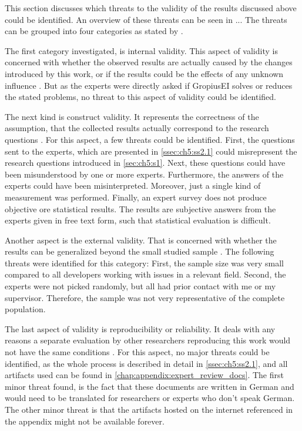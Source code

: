 This section discusses which threats to the validity of the results discussed above could be identified.
An overview of these threats can be seen in ...
The threats can be grouped into four categories as stated by \cite{runeson2009guidelines}.

The first category investigated, is internal validity.
This aspect of validity is concerned with whether the observed results are actually caused by the changes introduced by this work,
or if the results could be the effects of any unknown influence \cite{runeson2009guidelines}.
But as the experts were directly asked if \gls{GropiusEI} solves or reduces the stated problems, no threat to this aspect of validity could be identified.

The next kind is construct validity.
It represents the correctness of the assumption, that the collected results actually correspond to the research questions \cite{runeson2009guidelines}.
For this aspect, a few threats could be identified.
First, the questions sent to the experts, which are presented in \cref{ssec:ch5:ss2.1} could misrepresent the research questions 
introduced in \cref{sec:ch5:s1}.
Next, these questions could have been misunderstood by one or more experts.
Furthermore, the answers of the experts could have been misinterpreted.
Moreover, just a single kind of measurement was performed.
Finally, an expert survey does not produce objective ore statistical results.
The results are subjective answers from the experts given in free text form, such that statistical evaluation is difficult. 

Another aspect is the external validity.
That is concerned with whether the results can be generalized beyond the small studied sample \cite{runeson2009guidelines}.
The following threats were identified for this category:
First, the sample size was very small compared to all developers working with issues in a relevant field.
Second, the experts were not picked randomly, but all had prior contact with me or my supervisor.
Therefore, the sample was not very representative of the complete population.

The last aspect of validity is reproducibility or reliability.
It deals with any reasons a separate evaluation by other researchers reproducing this work would not have the same conditions \cite{runeson2009guidelines}.
For this aspect, no major threats could be identified, as the whole process is described in detail in \cref{ssec:ch5:ss2.1}, and all artifacts used can be found in \cref{chap:appendix:expert_review_docs}.
The first minor threat found, is the fact that these documents are written in German and would need to be translated for researchers or experts who don't speak German.
The other minor threat is that the artifacts hosted on the internet referenced in the appendix might not be available forever.